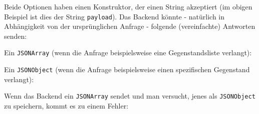 Beide Optionen haben einen Konstruktor, der einen String akzeptiert (im
obigen Beispiel ist dies der String \texttt{payload}). Das Backend
könnte - natürlich in Abhängigkeit von der ursprünglichen Anfrage -
folgende (vereinfachte) Antworten senden:

Ein \texttt{JSONArray} (wenn die Anfrage beispielsweise eine
Gegenstandsliste verlangt):

\begin{Shaded}
\begin{Highlighting}[]
\OtherTok{[}
  \FunctionTok{\{}
    \FunctionTok{:} \FunctionTok{,}
    \FunctionTok{:} 
  \FunctionTok{\}}\OtherTok{,}
  \FunctionTok{\{}
    \FunctionTok{:} \FunctionTok{,}
    \FunctionTok{:} 
  \FunctionTok{\}}
\OtherTok{]}
\end{Highlighting}
\end{Shaded}

Ein \texttt{JSONObject} (wenn die Anfrage beispielsweise einen
spezifischen Gegenstand verlangt):

\begin{Shaded}
\begin{Highlighting}[]
\FunctionTok{\{}
  \FunctionTok{:} \FunctionTok{,}
  \FunctionTok{:} 
\FunctionTok{\}}
\end{Highlighting}
\end{Shaded}

Wenn das Backend ein \texttt{JSONArray} sendet und man versucht, jenes
als \texttt{JSONObject} zu speichern, kommt es zu einem Fehler:

\begin{Shaded}
\begin{Highlighting}[]
\StringTok{"[}
\NormalTok{                        \{}
                            \NormalTok{: }\NormalTok{,}
                            \NormalTok{: }
\NormalTok{                        \},}
\NormalTok{                        \{}
                            \NormalTok{: }\NormalTok{,}
                            \NormalTok{: }
\NormalTok{                        \}}
\NormalTok{                    ]}

 
\end{Highlighting}
\end{Shaded}

